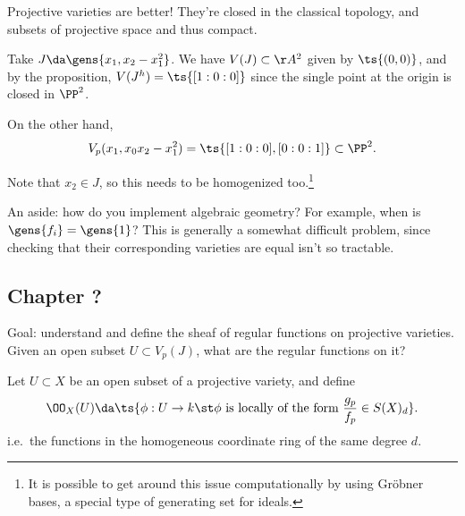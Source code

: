 \begin{remark}

Projective varieties are better! They're closed in the classical
topology, and subsets of projective space and thus compact.

\end{remark}

\begin{warnings}

Take \(J \da \gens{x_1, x_2 - x_1^2}\). We have \(V(J) \subset \AA^2\)
given by \(\ts{(0, 0)}\), and by the proposition,
\(V(J^h) = \ts{[1:0:0]}\) since the single point at the origin is closed
in \(\PP^2\).

On the other hand,
\begin{align*}  
V_p(x_1, x_0 x_2 - x_1^2) = \ts{[1:0:0], [0:0:1]} \subset \PP^2
.\end{align*}

Note that \(x_2 \in J\), so this needs to be homogenized too.\footnote{It
  is possible to get around this issue computationally by using Gröbner
  bases, a special type of generating set for ideals.}

\end{warnings}

\begin{remark}

An aside: how do you implement algebraic geometry? For example, when is
\(\gens{f_i} = \gens{1}\)? This is generally a somewhat difficult
problem, since checking that their corresponding varieties are equal
isn't so tractable.

\end{remark}

\hypertarget{chapter}{%
\subsection{Chapter ?}\label{chapter}}

Goal: understand and define the sheaf of regular functions on projective
varieties. Given an open subset \(U\subset V_p(J)\), what are the
regular functions on it?

\begin{definition}

Let \(U\subset X\) be an open subset of a projective variety, and define
\begin{align*}  
\OO_X(U) \da \ts{\phi:U\to k \st \phi \text{ is locally of the form }   {g_p \over f_p} \in S(X)_d }
.\end{align*} i.e.~the functions in the homogeneous coordinate ring of
the same degree \(d\).

\end{definition}

